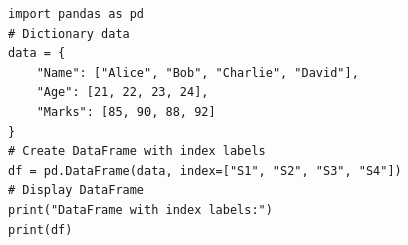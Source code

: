\begin{verbatim}
import pandas as pd
# Dictionary data
data = {
    "Name": ["Alice", "Bob", "Charlie", "David"],
    "Age": [21, 22, 23, 24],
    "Marks": [85, 90, 88, 92]
}
# Create DataFrame with index labels
df = pd.DataFrame(data, index=["S1", "S2", "S3", "S4"])
# Display DataFrame
print("DataFrame with index labels:")
print(df)
\end{verbatim}